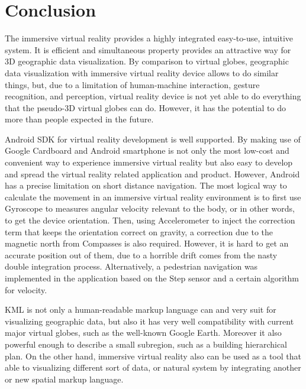 \chapter{Conclusion}
\label{chapter-conclusion}

The immersive virtual reality provides a highly integrated easy-to-use, intuitive system. It is efficient and simultaneous property provides an attractive way for 3D geographic data visualization. By comparison to virtual globes, geographic data visualization with immersive virtual reality device allows to do similar things, but, due to a limitation of human-machine interaction, gesture recognition, and perception, virtual reality device is not yet able to do everything that the pseudo-3D virtual globes can do. However, it has the potential to do more than people expected in the future.

Android SDK for virtual reality development is well supported. By making use of Google Cardboard and Android smartphone is not only the most low-cost and convenient way to experience immersive virtual reality but also easy to develop and spread the virtual reality related application and product. However, Android has a precise limitation on short distance navigation. The most logical way to calculate the movement in an immersive virtual reality environment is to first use Gyroscope to measures angular velocity relevant to the body, or in other words, to get the device orientation. Then, using Accelerometer to inject the correction term that keeps the orientation correct on gravity, a correction due to the magnetic north from Compasses is also required. However, it is hard to get an accurate position out of them, due to a horrible drift comes from the nasty double integration process. Alternatively, a pedestrian navigation was implemented in the application based on the Step sensor and a certain algorithm for velocity.

KML is not only a human-readable markup language can and very suit for visualizing geographic data, but also it has very well compatibility with current major virtual globes, such as the well-known Google Earth. Moreover it also powerful enough to describe a small subregion, such as a building hierarchical plan. On the other hand, immersive virtual reality also can be used as a tool that able to visualizing different sort of data, or natural system by integrating another or new spatial markup language.

